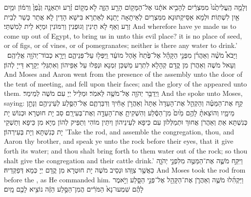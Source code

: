{וְלָמָ֤ה הֶֽעֱלִיתֻ֙נוּ֙ מִמִּצְרַ֔יִם לְהָבִ֣יא אֹתָ֔נוּ אֶל־הַמָּק֥וֹם הָרָ֖ע הַזֶּ֑ה לֹ֣א \legarmeh  מְק֣וֹם זֶ֗רַע וּתְאֵנָ֤ה וְגֶ֙פֶן֙ וְרִמּ֔וֹן וּמַ֥יִם אַ֖יִן לִשְׁתּֽוֹת׃}
{וּלְמָא אַסֵּיקְתּוּנָא מִמִּצְרַיִם לְאֵיתָאָה יָתַנָא לְאַתְרָא בִּישָׁא הָדֵין לָא אֲתַר כָּשַׁר לְבֵית זְרַע וְאַף לָא תֵינִין וְגוּפְנִין וְרִמּוֹנִין וּמַיָּא לֵית לְמִשְׁתֵּי׃}
{And wherefore have ye made us to come up out of Egypt, to bring us in unto this evil place? it is no place of seed, or of figs, or of vines, or of pomegranates; neither is there any water to drink.’}{}
{וַיָּבֹא֩ מֹשֶׁ֨ה וְאַהֲרֹ֜ן מִפְּנֵ֣י הַקָּהָ֗ל אֶל־פֶּ֙תַח֙ אֹ֣הֶל מוֹעֵ֔ד וַֽיִּפְּל֖וּ עַל־פְּנֵיהֶ֑ם וַיֵּרָ֥א כְבוֹד־יְהֹוָ֖ה אֲלֵיהֶֽם׃ \petucha }
{וְעָאל מֹשֶׁה וְאַהֲרֹן מִן קֳדָם קְהָלָא לִתְרַע מַשְׁכַּן זִמְנָא וּנְפַלוּ עַל אַפֵּיהוֹן וְאִתְגְּלִי יְקָרָא דַּייָ לְהוֹן׃}
{And Moses and Aaron went from the presence of the assembly unto the door of the tent of meeting, and fell upon their faces; and the glory of the \lord\space appeared unto them.}{}
{וַיְדַבֵּ֥ר יְהֹוָ֖ה אֶל־מֹשֶׁ֥ה לֵּאמֹֽר׃}
{וּמַלֵּיל יְיָ עִם מֹשֶׁה לְמֵימַר׃}
{And the \lord\space spoke unto Moses, saying:}{}
{קַ֣ח אֶת־הַמַּטֶּ֗ה וְהַקְהֵ֤ל אֶת־הָעֵדָה֙ אַתָּה֙ וְאַהֲרֹ֣ן אָחִ֔יךָ וְדִבַּרְתֶּ֧ם אֶל־הַסֶּ֛לַע לְעֵינֵיהֶ֖ם וְנָתַ֣ן מֵימָ֑יו וְהוֹצֵאתָ֨ לָהֶ֥ם מַ֙יִם֙ מִן־הַסֶּ֔לַע וְהִשְׁקִיתָ֥ אֶת־הָעֵדָ֖ה וְאֶת־בְּעִירָֽם׃
}
{סַב יָת חוּטְרָא וּכְנוֹשׁ יָת כְּנִשְׁתָּא אַתְּ וְאַהֲרֹן אֲחוּךְ וּתְמַלְּלוּן עִם כֵּיפָא לְעֵינֵיהוֹן וְיִתֵּין מוֹהִי וְתַפֵּיק לְהוֹן מַיָּא מִן כֵּיפָא וְתַשְׁקֵי יָת כְּנִשְׁתָּא וְיָת בְּעִירְהוֹן׃}
{’Take the rod, and assemble the congregation, thou, and Aaron thy brother, and speak ye unto the rock before their eyes, that it give forth its water; and thou shalt bring forth to them water out of the rock; so thou shalt give the congregation and their cattle drink.’}{}
{וַיִּקַּ֥ח מֹשֶׁ֛ה אֶת־הַמַּטֶּ֖ה מִלִּפְנֵ֣י יְהֹוָ֑ה כַּאֲשֶׁ֖ר צִוָּֽהוּ׃}
{וּנְסֵיב מֹשֶׁה יָת חוּטְרָא מִן קֳדָם יְיָ כְּמָא דְּפַקְּדֵיהּ׃}
{And Moses took the rod from before the \lord, as He commanded him.}{}
{וַיַּקְהִ֜לוּ מֹשֶׁ֧ה וְאַהֲרֹ֛ן אֶת־הַקָּהָ֖ל אֶל־פְּנֵ֣י הַסָּ֑לַע וַיֹּ֣אמֶר לָהֶ֗ם שִׁמְעוּ־נָא֙ הַמֹּרִ֔ים הֲמִן־הַסֶּ֣לַע הַזֶּ֔ה נוֹצִ֥יא לָכֶ֖ם מָֽיִם׃
}
